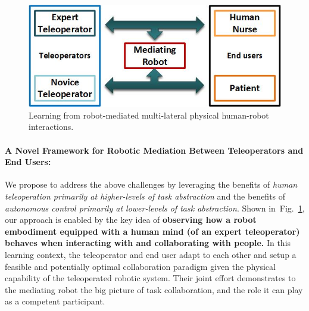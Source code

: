 \documentclass[letterpaper, 11 pt, onecolumn]{article}
\newcommand{\fig}[1]{Fig.~\ref{#1}}
\begin{document}

\begin{figure}
\centering
  \includegraphics[width=0.99\linewidth]{fig//001TeleNursing_Overview}
\caption{Learning from robot-mediated multi-lateral physical human-robot interactions.}
\label{001TeleNursing_Overview}
\end{figure}

\paragraph*{A Novel Framework for Robotic Mediation Between Teleoperators and End Users:} We propose to address the above challenges by leveraging the benefits of {\it human teleoperation primarily at higher-levels of task abstraction} and the benefits of {\it autonomous control primarily at lower-levels of task abstraction}. Shown in~\fig{001TeleNursing_Overview}, our approach is enabled by the key idea of {\bf observing how a robot embodiment equipped with a human mind (of an expert teleoperator) behaves when interacting with and collaborating with people.} In this learning context, the teleoperator and end user adapt to each other and setup a feasible and potentially optimal collaboration paradigm given the physical capability of the teleoperated robotic system. Their joint effort demonstrates to the mediating robot the big picture of task collaboration, and the role it can play as a competent participant. 

\end{document}
